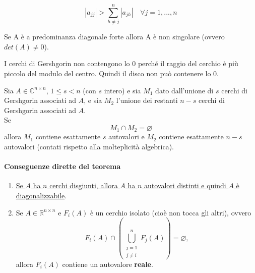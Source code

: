 \documentclass[12pt,a4paper,]{report}
\begin{document}
\begin{definizione}
    \[
    |a_{jj}| > \sum^n_{h\neq j}|a_{jh}| \quad \forall j = 1,...,n
    \]
\end{definizione}

\begin{teorema}
    Se A è a predominanza diagonale forte allora A è non singolare (ovvero $det(A)\neq 0$).\\
\end{teorema}
\begin{dimostrazione}
    I cerchi di Gershgorin non contengono lo 0 perché il raggio del cerchio è più piccolo del modulo del centro. Quindi il disco non può contenere lo 0.
\end{dimostrazione}

\begin{lezione}
    [Lezione 7 18/03]
\end{lezione}

\begin{teorema}
    Sia $A \in \mathbb{C}^{n \times n}$, $1 \le s < n$ (con $s$ intero) e sia $M_1$ dato dall'unione di $s$ cerchi di Gershgorin associati ad $A$, e sia $M_2$ l'unione dei restanti $n - s$ cerchi di Gershgorin associati ad $A$.
    \\
    Se
    \[
    M_1 \cap M_2 = \varnothing
    \]
    allora $M_1$ contiene esattamente $s$ autovalori e $M_2$ contiene esattamente $n - s$ autovalori (contati rispetto alla molteplicità algebrica).
\end{teorema}

\paragraph{Conseguenze dirette del teorema}
\begin{enumerate}
    \item \uline{Se $A$ ha $n$ cerchi disgiunti, allora $A$ ha $n$ autovalori distinti e quindi $A$ è diagonalizzabile}.
    
    \item Se $A \in \mathbb{R}^{n \times n}$ e $F_i(A)$ è un cerchio isolato (cioè non tocca gli altri), ovvero
    \[
    F_i(A) \cap \left( \bigcup_{\substack{j=1 \\ j \ne i}}^{n} F_j(A) \right) = \varnothing,
    \]
    allora $F_i(A)$ contiene un autovalore \textbf{reale}.
\end{enumerate}
\end{document}
